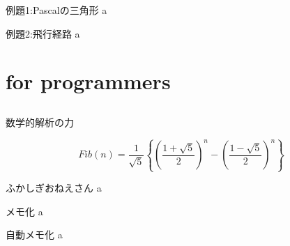 \documentclass{beamer}
\begin{document}
\begin{frame}[fragile]{例題1:Pascalの三角形}{}
a
\end{frame}

\begin{frame}[fragile]{例題2:飛行経路}{}
a
\end{frame}


\section{for programmers}		%
\subsection{}

\begin{frame}[fragile]{数学的解析の力}{}

\[
Fib(n) = \frac{1}{\sqrt{5}}
\left\{
\left(\frac{1 + \sqrt{5}}{2}\right)^n
-
\left(\frac{1 - \sqrt{5}}{2}\right)^n
\right\}
\]

\end{frame}

\begin{frame}[fragile]{ふかしぎおねえさん}{}
a
\end{frame}

\begin{frame}[fragile]{メモ化}{}
a
\end{frame}

\begin{frame}[fragile]{自動メモ化}{}
a
\end{frame}
\end{document}
